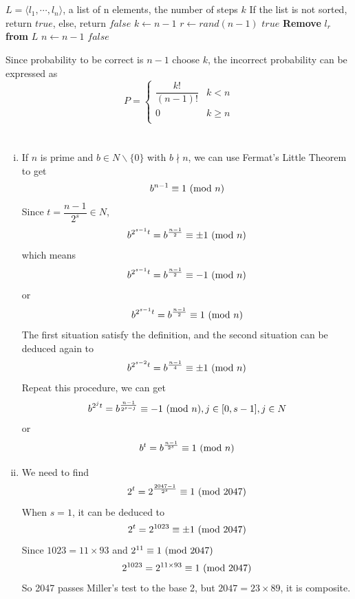 \documentclass{article}
\begin{document}
\section{}
\begin{algorithm}
\begin{algorithmic}[1]
	\Require $L=\langle l_1,\cdots,l_n \rangle$, a list of n elements, the number of steps $k$
	\Ensure If the list is not sorted, return $true$, else, return $false$
			\State $k \gets n-1$
		\EndIf
    		\State $r \gets rand(n-1)$
    			\State \Return $true$
    		\EndIf
    		\State \textbf{Remove} $l_r$ \textbf{from} $L$
    		 \State $n \gets n-1$
    	\EndFor
    	\State \Return $false$
    \EndFunction
\end{algorithmic}
\end{algorithm}

Since probability to be correct is $n-1$ choose $k$, the incorrect probability can be expressed as
\begin{equation*}                         
P=\left\lbrace
\begin{array}{ll}
\dfrac{k!}{(n-1)!}&k<n\\
0&k\geqslant n\\
\end{array}
\right.
\end{equation*}

\section{}
\begin{enumerate}[i)]
\item
If $n$ is prime and $b\in N\backslash\lbrace0\rbrace$ with $b\nmid n$, we can use Fermat's Little Theorem to get
$$b^{n-1}\equiv 1{\rm \ (mod\ }n)$$
Since $t=\dfrac{n-1}{2^s}\in N$,
$$b^{2^{s-1}t}=b^{\frac{n-1}{2}}\equiv \pm 1{\rm \ (mod\ }n)$$
which means
$$b^{2^{s-1}t}=b^{\frac{n-1}{2}}\equiv -1{\rm \ (mod\ }n)$$
or
$$b^{2^{s-1}t}=b^{\frac{n-1}{2}}\equiv 1{\rm \ (mod\ }n)$$
The first situation satisfy the definition, and the second situation can be deduced again to
$$b^{2^{s-2}t}=b^{\frac{n-1}{4}}\equiv \pm 1{\rm \ (mod\ }n)$$
Repeat this procedure, we can get
$$b^{2^{j}t}=b^{\frac{n-1}{2^{s-j}}}\equiv -1{\rm \ (mod\ }n),j\in[0,s-1],j\in N$$
or
$$b^{t}=b^{\frac{n-1}{2^s}}\equiv 1{\rm \ (mod\ }n)$$
\item
We need to find
$$2^t=2^{\frac{2047-1}{2^s}}\equiv 1{\rm \ (mod\ }2047)$$
When $s=1$, it can be deduced to
$$2^t=2^{1023}\equiv \pm 1{\rm \ (mod\ }2047)$$
Since $1023=11\times93$ and $2^{11}\equiv 1{\rm \ (mod\ }2047)$
$$2^{1023}=2^{11\times93}\equiv 1{\rm \ (mod\ }2047)$$
So 2047 passes Miller's test to the base 2, but $2047=23\times89$, it is composite.
\end{enumerate}
\end{document}
